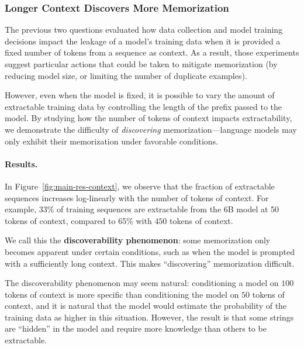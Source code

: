\subsubsection{Longer Context Discovers More Memorization}
\label{sec:context}
The previous two questions evaluated how data collection and model training decisions impact the leakage of a model's training data when it is provided a fixed number of tokens from a sequence as context.
As a result, those experiments suggest particular actions that could be taken to mitigate memorization (by reducing model size, or limiting the number of duplicate examples).

However, even when the model is fixed, it is possible to vary the amount of extractable training data by controlling the length of the prefix passed to the model. 
By studying how the number of tokens of context impacts extractability, we demonstrate the difficulty of \emph{discovering} memorization---language models may only exhibit their memorization under favorable conditions.


\paragraph{Results.}
In Figure~\ref{fig:main-res-context}, we observe that the fraction of extractable sequences increases log-linearly with the number of tokens of context. For example, 33\% of training sequences are extractable from the 6B model at 50 tokens of context, compared to 65\% with $450$ tokens of context.

We call this the \textbf{discoverability phenomenon}:
some memorization only becomes apparent under certain conditions, such as when the model is prompted with a sufficiently long context.
This makes ``discovering'' memorization difficult.

%

The discoverability phenomenon may seem natural: conditioning a model on $100$ tokens of context is more specific than conditioning the model on $50$ tokens of context, and it is natural that the model would estimate the probability of the training data as higher in this situation. 
However, the result is that some strings are ``hidden'' in the model and require more knowledge than others to be extractable.

